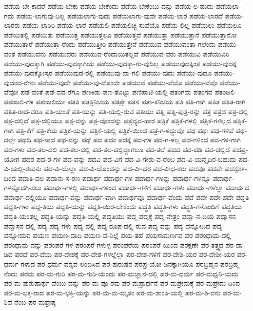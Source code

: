 {ಪಡೆಯ-ಬೇ-ಕಾದರೆ
ಪಡೆಯ-ಬೇಕು
ಪಡೆಯ-ಬೇಕೆಂದು
ಪಡೆಯ-ಬೇಕೆಂಬು-ದನ್ನು
ಪಡೆಯ-ಲ-ಹುದು
ಪಡೆಯಲಾ-ಗದು
ಪಡೆಯ-ಲಾಗುವು-ದಿಲ್ಲ
ಪಡೆಯಲಾಗು-ವುದು
ಪಡೆಯಲಾಗು-ವುದೇ
ಪಡೆಯ-ಲಾರ
ಪಡೆಯ-ಲಾರದೆ
ಪಡೆಯ-ಲಾರರು
ಪಡೆಯ-ಲಾರಿರಿ
ಪಡೆಯ-ಲಾರೆ
ಪಡೆಯಲಿ
ಪಡೆಯಲಿಚ್ಛಿ-ಸುವೆಯೊ
ಪಡೆಯ-ಲಿಲ್ಲ
ಪಡೆಯಲು
ಪಡೆಯಲೂ
ಪಡೆಯಿತಲ್ಲಿ
ಪಡೆಯಿತು
ಪಡೆಯುತ್ತ
ಪಡೆಯುತ್ತಲೂ
ಪಡೆಯುತ್ತವೆ
ಪಡೆಯುತ್ತಾ
ಪಡೆಯುತ್ತಾನೆ
ಪಡೆಯುತ್ತಾನೋ
ಪಡೆಯುತ್ತಾರೆ
ಪಡೆಯುತ್ತಾ-ರೆಂದು
ಪಡೆಯುತ್ತೀರಿ
ಪಡೆಯುತ್ತೇನೆ
ಪಡೆಯುವ
ಪಡೆಯುವಂತಾ-ಗಲೆಂದು
ಪಡೆಯು-ವಂತೆ
ಪಡೆಯುವನು
ಪಡೆಯುವರು
ಪಡೆಯುವ-ರೆಂದಾಯಿತಲ್ಲವೆ
ಪಡೆಯುವ-ವರು
ಪಡೆಯುವಿ
ಪಡೆಯುವಿರಿ
ಪಡೆಯು-ವುದಕ್ಕಾಗಿ
ಪಡೆಯು-ವುದಕ್ಕಾಗಿಯೆ
ಪಡೆಯು-ವುದಕ್ಕಾ-ಗು-ವುದಿಲ್ಲ
ಪಡೆಯುವುದಕ್ಕಿಂತ
ಪಡೆಯು-ವುದಕ್ಕೆ
ಪಡೆಯು-ವುದಕ್ಕೋಸ್ಕರ
ಪಡೆಯುವುದ-ರಲ್ಲಿ
ಪಡೆಯುವು-ದಾ-ಗಲಿ
ಪಡೆಯು-ವುದು
ಪಡೆಯು-ವುದೂ
ಪಡೆಯು-ವುದೆಂದ-ರೇನು
ಪಡೆಯು-ವುದೇ
ಪಡೆಯು-ವು-ದೊಂದೇ
ಪಡೆಯುವೆ
ಪಡೆಯು-ವೆಯೊ
ಪಡೆಯು-ವೆವೊ
ಪಡೆಯು-ವೆವೋ
ಪಡೆ-ವಂತೆ
ಪಡೆ-ವವ-ರೆಗೂ
ಪಣಕಿಡು
ಪಣ-ತೊಟ್ಟು
ಪಣಿಹಾಟಿ-ಯಲ್ಲಿ
ಪತಂಗಮ
ಪತಂಗವ
ಪತಂಜಲಿ
ಪತಂಜಲಿ-ಗಳ
ಪತಂಜಲಿಯೇ
ಪತತಿ
ಪತತ್ರಿನಿಚಯ
ಪತತ್ರೇ
ಪತನ
ಪತಾ-ಕನಿಚಯ
ಪತಿ
ಪತಿ-ಗಾಗಿ
ಪತಿತ
ಪತಿತ-ರಾಗಿ
ಪತಿತ-ರಾದ-ವರೂ
ಪತಿ-ಯಂತೆ
ಪತಿ-ಯನ್ನು
ಪತಿ-ಯಲ್ಲಿ-ರುವ
ಪತಿಯು
ಪತ್ನಿ
ಪತ್ನಿ-ಪುತ್ರ-ರನ್ನು
ಪತ್ರ
ಪತ್ರದ
ಪತ್ರ-ದಲ್ಲಿ
ಪತ್ರ-ದಲ್ಲಿದೆ
ಪತ್ರ-ದಲ್ಲಿಯೂ
ಪತ್ರ-ವನ್ನು
ಪತ್ರ-ವೊಂದನ್ನು
ಪತ್ರವ್ಯವ-ಹಾರ
ಪತ್ರಿಕೆ
ಪತ್ರಿಕೆ-ಗಳಲ್ಲಿ
ಪತ್ರಿಕೆ-ಗಳಿಲ್ಲದ
ಪತ್ರಿಕೆ-ಗಾಗಿ
ಪತ್ರಿ-ಕೆಗೆ
ಪತ್ರಿ-ಕೆಯ
ಪತ್ರಿಕೆ-ಯನ್ನು
ಪತ್ರಿಕೆ-ಯಲ್ಲಿ
ಪತ್ರಿಕೆ-ಯಿಂದ
ಪತ್ರೆ-ಗ-ಳಿದ್ದುವೊ
ಪಥ
ಪಥಃ
ಪಥ-ಗಳಿವೆ
ಪಥ-ದಲ್ಲೇ
ಪಥದಿ
ಪಥ-ನಾದ
ಪಥ-ವನ್ನು
ಪಥೆ
ಪದ
ಪದಂ
ಪದಕ್ಕೆ
ಪದ-ಗಳ
ಪದ-ಗ-ಳಲ್ಲ
ಪದ-ಗಳಿಂದ
ಪದ-ಗಳಿ-ಗಾಗಿ
ಪದ-ಗಳು
ಪದ-ತಲ-ದಲಿ
ಪದ-ತಲ-ದಲ್ಲಿ
ಪದ-ತಲ-ದಲ್ಲಿದ್ದಾಗಲೂ
ಪದ-ತಲೆ
ಪದದ
ಪದ-ದಡಿ
ಪದ-ದಲ್ಲಿದೆ
ಪದಪ್ರ-ಯೋಗ
ಪದರ
ಪದ-ರ-ಗಳ
ಪದ-ವನ್ನು
ಪದವಿ
ಪದ-ವಿಗೆ
ಪದ-ವಿ-ಗೇರು-ವ-ರೆಂಬ
ಪದ-ವಿ-ಯನ್ನೈದಿರ-ಬಹುದು
ಪದ-ವಿ-ಯಲ್ಲಿ-ರುವನು
ಪದ-ವಿ-ಯೆಲ್ಲಾ
ಪದ-ವಿ-ಯೊಂದನ್ನು
ಪದ-ವೀ-ಧರ
ಪದ-ವೀಧ-ರರು
ಪದವೂ
ಪದವೇ
ಪದಸ್ಪರ್ಶ-ದಿಂದ
ಪದಾತಿ-ದಲ
ಪದಾನು-ಸ-ರಣ
ಪದಾರ್ಥ
ಪದಾರ್ಥ-ಗಳ
ಪದಾರ್ಥ-ಗಳನ್ನು
ಪದಾರ್ಥ-ಗಳನ್ನೂ
ಪದಾರ್ಥ-ಗಳನ್ನೊದಗಿ-ಸಲು
ಪದಾರ್ಥ-ಗಳಲ್ಲಿ
ಪದಾರ್ಥ-ಗಳಿಂದ
ಪದಾರ್ಥ-ಗಳಿಗೆ
ಪದಾರ್ಥ-ಗಳು
ಪದಾರ್ಥ-ಗಳೆಲ್ಲಾ
ಪದಾರ್ಥದ
ಪದಾರ್ಥ-ದಲ್ಲಿಯೂ
ಪದಾರ್ಥ-ವನ್ನು
ಪದಾರ್ಥ-ವಾಗಿ
ಪದಾರ್ಥವೂ
ಪದಾರ್ಥ-ವೆಂದು
ಪದೆ
ಪದೇ
ಪದೇ-ಪದೇ
ಪದ್ದತಿ
ಪದ್ದತಿ-ಗಳು
ಪದ್ದ-ತಿಯ
ಪದ್ದತಿ-ಯನ್ನು
ಪದ್ದತಿ-ಯಿರ-ಬೇಕೆಂದು
ಪದ್ಧತಿ
ಪದ್ಧತಿ-ಗಳು
ಪದ್ಧತಿ-ಗಳೊಂದಿಗೆ
ಪದ್ಧತಿಯ
ಪದ್ಧತಿ-ಯಂತಲ್ಲ
ಪದ್ಧತಿ-ಯನ್ನು
ಪದ್ಧತಿ-ಯಲ್ಲಿ
ಪದ್ಧತಿಯು
ಪದ್ಮ
ಪದ್ಮಕ್ಕೆ
ಪದ್ಮ-ನೇತ್ರಂ
ಪದ್ಮಾ-ನ-ದಿಯ
ಪದ್ಮಾಸನ
ಪದ್ಮಾಸನ-ದಲ್ಲಿ
ಪದ್ಯ
ಪದ್ಯ-ಗಳು
ಪದ್ಯ-ದಲ್ಲಿ
ಪದ್ಯ-ರೂಪ-ದಲ್ಲಿ-ರುವ
ಪದ್ಯ-ವನ್ನು
ಪದ್ಯ-ವನ್ನೋದಿದ
ಪದ್ಯ-ವನ್ನೋದುವ
ಪಯಣ
ಪಯಣ-ದಾದಿ
ಪಯಣ-ವ-ನಿಲ್ಲೆ
ಪಯ-ತಹೆ
ಪಯಸಾಮರ್ಣವ
ಪರ
ಪರಂಧಾಮ-ದಲ್ಲಿ
ಪರಂಧಾಮ-ವನ್ನು
ಪರಂಪರೆ-ಗಳ
ಪರಂಪರೆ-ಗಳುಳ್ಳ
ಪರಂಪರೆಯ
ಪರಂಪರೆ-ಯಿಂದ
ಪರಕ್ಷಣೇ
ಪರ-ತತ್ತ್ವದ
ಪರ-ದಾ-ಡಿದ
ಪರದೆ
ಪರ-ದೆಯ
ಪರ-ದೇಶಕ್ಕೆ
ಪರ-ದೇಶ-ಗಳಲ್ಲೆಲ್ಲಾ
ಪರ-ದೇಶ-ಗಳಿಗೆ
ಪರ-ದೇಶಿ-ಯರ
ಪರ-ದೇಶೀ-ಯರ
ಪರ-ಧರ್ಮ-ಗಳಾದ
ಪರ-ಧರ್ಮ-ವನ್ನವ-ಲಂಬಿಸಿದ
ಪರ-ಪುರುಷನ
ಪರಪ್ರ-ಯೋ-ಜನಕ್ಕಾಗಿಯೂ
ಪರಬ್ರಹ್ಮನ
ಪರಬ್ರಹ್ಮ-ನೆಂದು
ಪರಮ
ಪರ-ಮ-ಗುರಿ
ಪರ-ಮ-ಗುರಿ-ಯೆಂದು
ಪರ-ಮಜ್ಞಾನ-ದಲ್ಲಿ
ಪರ-ಮ-ಧರ್ಮ
ಪರ-ಮಧ್ವನಿ-ಯದು
ಪರ-ಮ-ಪುರುಷಾರ್ಥ-ವೆಂಬು-ದನ್ನು
ಪರ-ಮ-ಪೂ-ರವು
ಪರ-ಮಪ್ರಾರ್ಥನೆ
ಪರ-ಮಪ್ರೇಮಕ್ಕೆ
ಪರ-ಮಪ್ರೇಮ-ದಿಂದ
ಪರ-ಮ-ಭಕ್ತ-ರಾದ
ಪರ-ಮ-ಭಕ್ತಿ-ಯನ್ನು
ಪರ-ಮ-ಮ-ಮೃತಂ
ಪರ-ಮ-ಶಾಂತಿ-ಯಲ್ಲಿ
ಪರ-ಮ-ಶಿ-ವನು
ಪರ-ಮ-ಶಿವ-ನೆಂಬ
ಪರ-ಮಶ್ರೇಷ್ಠ
}
